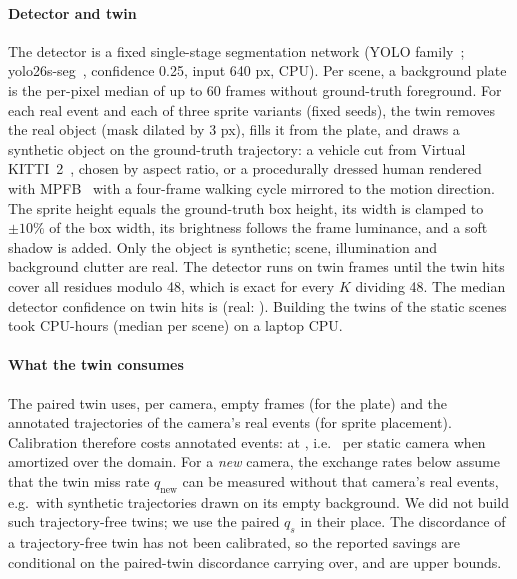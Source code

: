 \paragraph{Detector and twin} The detector is a fixed single-stage segmentation network (YOLO family~\cite{redmon2016};
yolo26s-seg~\cite{ultralytics}, confidence 0.25, input 640 px, CPU). Per scene, a background plate is the per-pixel median
of up to 60 frames without ground-truth foreground. For each real event and each of three sprite variants (fixed
seeds), the twin removes the real object (mask dilated by 3 px), fills it from the plate, and draws a synthetic object
on the ground-truth trajectory: a vehicle cut from Virtual KITTI~2~\cite{cabon2020vkitti2}, chosen by aspect ratio, or
a procedurally dressed human rendered with MPFB~\cite{mpfb2} with a four-frame walking cycle mirrored to the motion
direction. The sprite height equals the ground-truth box height, its width is clamped to $\pm10\%$ of the box width, its
brightness follows the frame luminance, and a soft shadow is added. Only the object is synthetic; scene, illumination
and background clutter are real. The detector runs on twin frames until the twin hits cover all residues modulo 48,
which is exact for every $K$ dividing 48. The median detector confidence on twin hits is \nConfTwin{} (real:
\nConfReal). Building the twins of the \nMainScenes{} static scenes took \nTwinCostTotal{} CPU-hours (median \nTwinCostScene{} per
scene) on a laptop CPU.

\paragraph{What the twin consumes} The paired twin uses, per camera, empty frames (for the plate) and the annotated
trajectories of the camera's real events (for sprite placement). Calibration therefore costs annotated events:
\nMainN{} at \OPs, i.e.\ \nCalibPerCam{} per static camera when amortized over the domain. For a \emph{new} camera, the
exchange rates below assume that the twin miss rate $q_{\mathrm{new}}$ can be measured without that camera's real
events, e.g.\ with synthetic trajectories drawn on its empty background. We did not build such trajectory-free twins;
we use the paired $q_s$ in their place. The discordance of a trajectory-free twin has not been calibrated, so the
reported savings are conditional on the paired-twin discordance carrying over, and are upper bounds.

